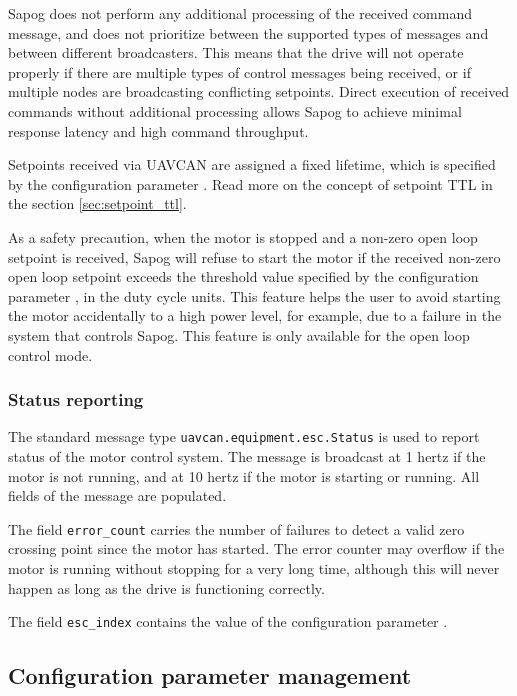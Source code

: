 \documentclass{zubaxdoc}
\begin{document}
Sapog does not perform any additional processing of the received command message,
and does not prioritize between the supported types of messages
and between different broadcasters.
This means that the drive will not operate properly if there are multiple types of control
messages being received, or if multiple nodes are broadcasting conflicting setpoints.
Direct execution of received commands without additional processing allows Sapog to achieve
minimal response latency and high command throughput.

Setpoints received via UAVCAN are assigned a fixed lifetime, which is specified by the
configuration parameter .
Read more on the concept of setpoint TTL in the section \ref{sec:setpoint_ttl}.

As a safety precaution, when the motor is stopped and a non-zero open loop setpoint is received,
Sapog will refuse to start the motor if the received non-zero open loop setpoint exceeds the
threshold value specified by the configuration parameter ,
in the duty cycle units.
This feature helps the user to avoid starting the motor accidentally to a high power level,
for example, due to a failure in the system that controls Sapog.
This feature is only available for the open loop control mode.

\subsubsection{Status reporting}

The standard message type \verb|uavcan.equipment.esc.Status| is used to report status of the
motor control system.
The message is broadcast at 1 hertz if the motor is not running,
and at 10 hertz if the motor is starting or running.
All fields of the message are populated.

The field \verb|error_count| carries the number of failures to detect a valid zero crossing
point since the motor has started.
The error counter may overflow if the motor is running without stopping for a very long time,
although this will never happen as long as the drive is functioning correctly.

The field \verb|esc_index| contains the value of the configuration parameter .

\subsection{Configuration parameter management}
\end{document}
